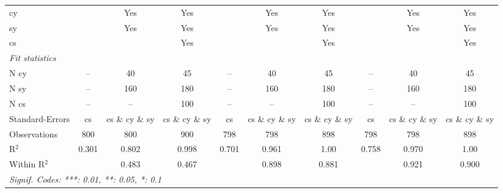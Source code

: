\begin{tabular}{lccccccccc}
cy &  & Yes & Yes &  & Yes & Yes &  & Yes & Yes\\
sy &  & Yes & Yes &  & Yes & Yes &  & Yes & Yes\\
cs &  &  & Yes &  &  & Yes &  &  & Yes\\
\midrule \emph{Fit statistics}&  & & & & & & & & \\
N cy & -- & 40 & 45 & -- & 40 & 45 & -- & 40 & 45\\
N sy & -- & 160 & 180 & -- & 160 & 180 & -- & 160 & 180\\
N cs & -- & -- & 100 & -- & -- & 100 & -- & -- & 100\\
Standard-Errors& cs&cs \& cy \& sy&cs \& cy \& sy&cs&cs \& cy \& sy&cs \& cy \& sy&cs&cs \& cy \& sy&cs \& cy \& sy\\
Observations & 800&800&900&798&798&898&798&798&898\\
R$^2$ & 0.301&0.802&0.998&0.701&0.961&1.00&0.758&0.970&1.00\\
Within R$^2$ & &0.483&0.467&&0.898&0.881&&0.921&0.900\\
\multicolumn{10}{l}{\emph{Signif. Codes: ***: 0.01, **: 0.05, *: 0.1}}\\
\end{tabular}


